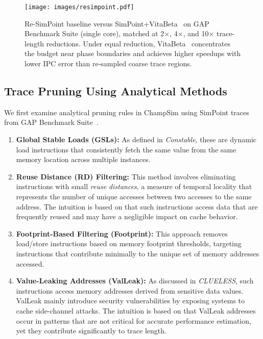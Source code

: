 \documentclass[conference]{IEEEtran}
\newcommand{\name}{VitaBeta }
\begin{document}
\begin{figure}[!htbp]
    \centering
    \setlength{\belowcaptionskip}{-10pt}
    \captionsetup{skip=0pt}
    \captionsetup[subfigure]{font=footnotesize, skip=1pt}
    \texttt{[image: images/resimpoint.pdf]}
    \caption{Re-SimPoint baseline versus SimPoint+\name\ on GAP Benchmark Suite (single core), matched at 2$\times$, 4$\times$, and 10$\times$ trace-length reductions.  Under equal reduction, \name\ concentrates the budget near phase boundaries and achieves higher speedups with lower IPC error than re-sampled coarse trace regions.}
    \label{fig:benchmarks}
\end{figure}

\subsection*{Trace Pruning Using Analytical Methods}
We first examine analytical pruning rules in ChampSim using SimPoint traces from GAP Benchmark Suite~\cite{beamer2017gapbenchmarksuite}.
\begin{enumerate}[nosep, leftmargin=*]
    \item \textbf{Global Stable Loads (GSLs):} As defined in \textit{Constable}\cite{constable}, these are dynamic load instructions that consistently fetch the same value from the same memory location across multiple instances.  
    \item \textbf{Reuse Distance (RD) Filtering:} This method involves eliminating instructions with small \emph{reuse distances}, a measure of temporal locality that represents the number of unique accesses between two accesses to the same address. The intuition is based on that such instructions access  data that are frequently reused and may have a negligible impact on cache behavior.
    \item \textbf{Footprint-Based Filtering (Footprint):} This approach removes load/store instructions based on memory footprint thresholds, targeting instructions that contribute minimally to the unique set of memory addresses accessed.
    \item \textbf{Value-Leaking Addresses (ValLeak):} As discussed in \emph{CLUELESS}\cite{clueless}, such instructions access memory addresses derived from sensitive data values. ValLeak mainly introduce security vulnerabilities by exposing systems to cache side-channel attacks. { The intuition is based on that ValLeak addresses occur in patterns that are not critical for accurate performance estimation, yet they contribute significantly to trace length.}
\end{enumerate} 
\end{document}
